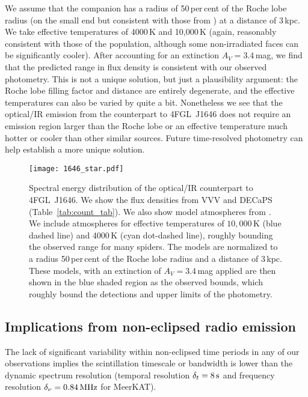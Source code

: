 \documentclass[fleqn,usenatbib]{mnras}
\newcommand{\blinky}{{4FGL}~J1646}
\begin{document}
We assume that the companion has a radius of 50\,per\,cent of the Roche lobe radius (on the small end but consistent with those from \citealt{2023MNRAS.520.2217M}) at a distance of 3\,kpc.  We take effective temperatures of 4000\,K and 10,000\,K (again, reasonably consistent with those of the population, although some non-irradiated faces can be significantly cooler).  After accounting for an extinction $A_V=3.4\,$mag, we find that the predicted range in flux density is consistent with our observed photometry.  This is not a unique solution, but just a plausibility argument: the Roche lobe filling factor and distance are entirely degenerate, and the effective temperatures can also be varied by quite a bit.  Nonetheless we see that the optical/IR emission from the counterpart to \blinky{} does not require an emission region larger than the Roche lobe or an effective temperature much hotter or cooler than other similar sources.  Future time-resolved photometry can help establish a more unique solution.

\begin{figure}
\centering
    \texttt{[image: 1646\_star.pdf]}
    \caption{Spectral energy distribution of the optical/IR counterpart to \blinky{}.  We show the flux densities from VVV and DECaPS (Table~\ref{tab:count_tab}).  We also show model atmospheres from \citet{2003IAUS..210P.A20C}.  We include atmospheres for effective temperatures of $10,000$\,K (blue dashed line) and 4000\,K (cyan dot-dashed line), roughly bounding the observed range for many spiders.  The models are normalized to a radius 50\,per\,cent of the Roche lobe radius and a distance of {3\,kpc}. These models, with an extinction of {$A_V=3.4$\,mag} applied are then shown in the blue shaded region as the observed bounds, which roughly bound the detections and upper limits of the photometry.}
    \label{fig:oir}
\end{figure}



\subsection{Implications from non-eclipsed radio emission}
\label{subsec:stableemission}
The lack of significant variability within non-eclipsed time periods in any of our observations implies the scintillation timescale or bandwidth is lower than the dynamic spectrum resolution (temporal resolution $\delta_t = 8\,{\rm s}$ and frequency resolution $\delta_\nu = 0.84\,{\rm MHz}$ for MeerKAT).
\end{document}

